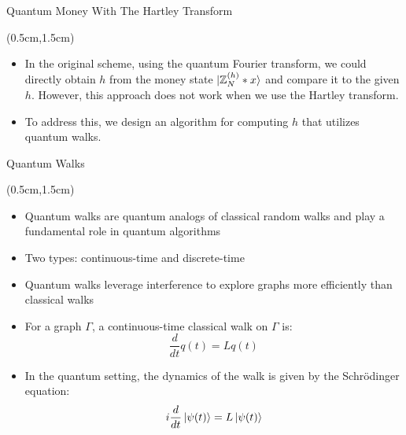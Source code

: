 \documentclass{beamer}
\theoremstyle{definition}
\begin{document}
\begin{frame}{Quantum Money With The Hartley Transform}
    
    \begin{textblock*}{12cm}(0.5cm,1.5cm)
        \begin{itemize}
            \item  In the original scheme, using the quantum Fourier transform, we could directly obtain $h$ from the money state $\ket{\mathbb{Z}_N^{(h)} * x}$ and compare it to the given $h$. However, this approach does not work when we use the Hartley transform. 
            \vspace{1cm}
            \item  To address this, we design an algorithm for computing $h$ that utilizes quantum walks. 

        \end{itemize}
        
        
       
        
    \end{textblock*}


\end{frame}



\begin{frame}{Quantum Walks}
    
    \begin{textblock*}{12cm}(0.5cm,1.5cm)

        \begin{itemize}
            \item Quantum walks are quantum analogs of classical random walks and play
            a fundamental role in quantum algorithms
            \item  Two types: continuous-time and discrete-time
            \item Quantum walks leverage interference to explore graphs more efficiently than classical walks
            \item For a graph $\Gamma$, a continuous-time classical walk on $\Gamma$ is:
            \[
            \frac{d}{dt} q(t) = Lq(t)
            \]
            \item In the quantum setting,  the dynamics of the walk is given by the Schr\"{o}dinger equation:
            \[
                i\frac{d}{dt}\ket{\psi(t)} = L\ket{\psi(t)}
            \]
            
        \end{itemize}
            
    \end{textblock*}
\end{frame}
\end{document}
